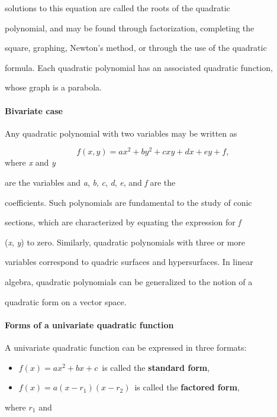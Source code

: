 solutions to this equation are called the roots of the quadratic

polynomial, and may be found through factorization, completing the

square, graphing, Newton's method, or through the use of the quadratic

formula. Each quadratic polynomial has an associated quadratic function,

whose graph is a parabola.



\paragraph{Bivariate case}



Any quadratic polynomial with two variables may be written as



$$f(x,y) = a x^2 + b y^2 + cxy + dx+ e y + f, \,$$ where \textit{x} and \textit{y}

are the variables and \textit{a}, \textit{b}, \textit{c}, \textit{d}, \textit{e}, and \textit{f} are the

coefficients. Such polynomials are fundamental to the study of conic

sections, which are characterized by equating the expression for \textit{f}

(\textit{x}, \textit{y}) to zero. Similarly, quadratic polynomials with three or more

variables correspond to quadric surfaces and hypersurfaces. In linear

algebra, quadratic polynomials can be generalized to the notion of a

quadratic form on a vector space.



\paragraph{Forms of a univariate quadratic function}



A univariate quadratic function can be expressed in three formats:



\begin{itemize}
    \item $f(x) = a x^2 + b x + c \,$ is called the \textbf{standard form},
    \item $f(x) = a(x - r_1)(x - r_2)\,$ is called the \textbf{factored form},
\end{itemize}
    where \textit{$r_1$} and

